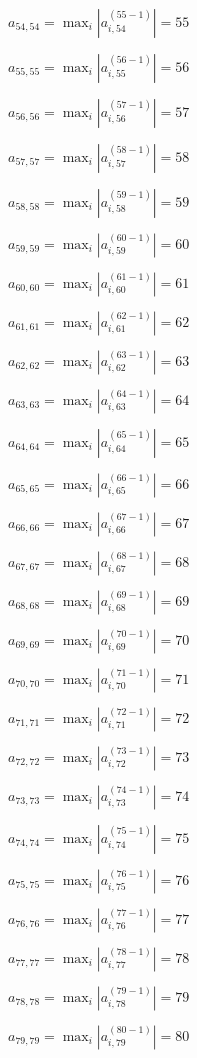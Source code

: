 \documentclass[a4paper,12pt]{article}
\begin{document}
$a _{ 54, 54 } =  \max _i |a _{ i, 54 } ^{ (55 - 1) } | = 55$

$a _{ 55, 55 } =  \max _i |a _{ i, 55 } ^{ (56 - 1) } | = 56$

$a _{ 56, 56 } =  \max _i |a _{ i, 56 } ^{ (57 - 1) } | = 57$

$a _{ 57, 57 } =  \max _i |a _{ i, 57 } ^{ (58 - 1) } | = 58$

$a _{ 58, 58 } =  \max _i |a _{ i, 58 } ^{ (59 - 1) } | = 59$

$a _{ 59, 59 } =  \max _i |a _{ i, 59 } ^{ (60 - 1) } | = 60$

$a _{ 60, 60 } =  \max _i |a _{ i, 60 } ^{ (61 - 1) } | = 61$

$a _{ 61, 61 } =  \max _i |a _{ i, 61 } ^{ (62 - 1) } | = 62$

$a _{ 62, 62 } =  \max _i |a _{ i, 62 } ^{ (63 - 1) } | = 63$

$a _{ 63, 63 } =  \max _i |a _{ i, 63 } ^{ (64 - 1) } | = 64$

$a _{ 64, 64 } =  \max _i |a _{ i, 64 } ^{ (65 - 1) } | = 65$

$a _{ 65, 65 } =  \max _i |a _{ i, 65 } ^{ (66 - 1) } | = 66$

$a _{ 66, 66 } =  \max _i |a _{ i, 66 } ^{ (67 - 1) } | = 67$

$a _{ 67, 67 } =  \max _i |a _{ i, 67 } ^{ (68 - 1) } | = 68$

$a _{ 68, 68 } =  \max _i |a _{ i, 68 } ^{ (69 - 1) } | = 69$

$a _{ 69, 69 } =  \max _i |a _{ i, 69 } ^{ (70 - 1) } | = 70$

$a _{ 70, 70 } =  \max _i |a _{ i, 70 } ^{ (71 - 1) } | = 71$

$a _{ 71, 71 } =  \max _i |a _{ i, 71 } ^{ (72 - 1) } | = 72$

$a _{ 72, 72 } =  \max _i |a _{ i, 72 } ^{ (73 - 1) } | = 73$

$a _{ 73, 73 } =  \max _i |a _{ i, 73 } ^{ (74 - 1) } | = 74$

$a _{ 74, 74 } =  \max _i |a _{ i, 74 } ^{ (75 - 1) } | = 75$

$a _{ 75, 75 } =  \max _i |a _{ i, 75 } ^{ (76 - 1) } | = 76$

$a _{ 76, 76 } =  \max _i |a _{ i, 76 } ^{ (77 - 1) } | = 77$

$a _{ 77, 77 } =  \max _i |a _{ i, 77 } ^{ (78 - 1) } | = 78$

$a _{ 78, 78 } =  \max _i |a _{ i, 78 } ^{ (79 - 1) } | = 79$

$a _{ 79, 79 } =  \max _i |a _{ i, 79 } ^{ (80 - 1) } | = 80$
\end{document}

